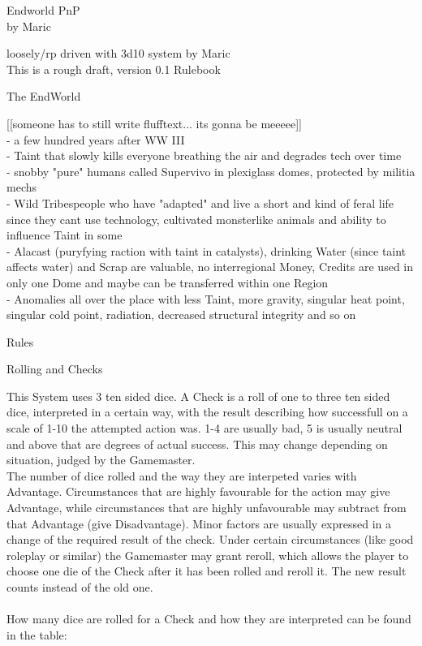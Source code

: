 \documentclass{article}
\newcommand{\headline}[1]{\begin{center}\Large #1 \normalsize \end{center}}
\newcommand{\subhline}[1]{\begin{center}\large #1 \normalsize \end{center}}
\begin{document}
\begin{center}\huge
Endworld PnP\\\large by Maric\\\normalsize \end{center}
loosely/rp driven with 3d10 system by Maric\\
This is a rough draft, version 0.1 Rulebook\\
\headline{The EndWorld}

[[someone has to still write flufftext... its gonna be meeeee]]\\

- a few hundred years after WW III\\

- Taint that slowly kills everyone breathing the air and degrades tech over time\\

- snobby "pure" humans called Supervivo in plexiglass domes, protected by militia mechs\\

- Wild Tribespeople who have "adapted" and live a short and kind of feral life since they cant use technology, cultivated monsterlike animals and ability to influence Taint in some\\

- Alacast (puryfying raction with taint in catalysts), drinking Water (since taint affects water) and Scrap are valuable, no interregional Money, Credits are used in only one Dome and maybe can be transferred within one Region\\

- Anomalies all over the place with less Taint, more gravity, singular heat point, singular cold point, radiation, decreased structural integrity and so on\\

\headline{Rules}
\subhline{Rolling and Checks}

This System uses 3 ten sided dice. A Check is a roll of  one to three ten sided dice, interpreted
in a certain way, with the result describing how successfull on a scale of 1-10 the attempted action was.
1-4 are usually bad, 5 is usually neutral and above that are degrees of actual success.
This may change depending on situation, judged by the Gamemaster. \\
The number of dice rolled and the way they are interpeted varies with Advantage.
Circumstances that are highly favourable for the action may give Advantage, while circumstances
that are highly unfavourable may subtract from that Advantage (give Disadvantage).
Minor factors are usually expressed in a change of the required result of the check. Under certain circumstances (like
good roleplay or similar) the Gamemaster may grant reroll, which allows the player to choose one die of the Check after
it has been rolled and reroll it. The new result counts instead of the old one. \\ \\
How many dice are rolled for a Check and how they are interpreted can be found in the table:\\
\end{document}
